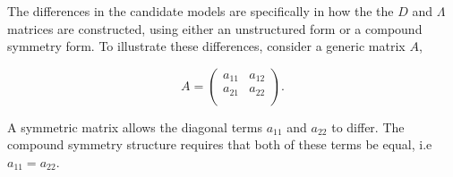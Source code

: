 \documentclass[12pt, a4paper]{report}
\theoremstyle{plain}
\theoremstyle{definition}
\theoremstyle{remark}
\begin{document}
%	
 The differences in the candidate models are specifically in how the the $D$ and $\Lambda$ matrices are constructed, using either an unstructured form or a compound symmetry form. To illustrate these differences, consider a generic matrix $A$,
	
	\[
	{A} = \left( \begin{array}{cc}
	a_{11} & a_{12}  \\
	a_{21} & a_{22}  \\
	\end{array}\right).
	\]
	
	A symmetric matrix allows the diagonal terms $a_{11}$ and $a_{22}$ to differ. The compound symmetry structure requires that both of these terms be equal, i.e $a_{11} = a_{22}$.
	
\end{document}
